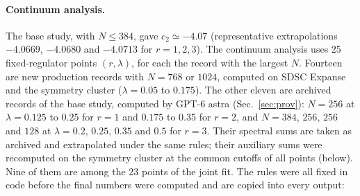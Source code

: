 \documentclass[11pt,a4paper]{article}
\numberwithin{equation}{section}
\begin{document}
\paragraph{Continuum analysis.} The base study, with $N\le384$, gave $c_2\simeq-4.07$ (representative extrapolations
$-4.0669$, $-4.0680$ and $-4.0713$ for $r=1,2,3$). The continuum analysis uses 25 fixed-regulator points $(r,\lambda)$,
for each the record with the largest $N$. Fourteen are new production records with $N=768$ or $1024$, computed on SDSC
Expanse and the symmetry cluster ($\lambda=0.05$ to $0.175$). The other eleven are archived records of the base study,
computed by GPT-6 astra (Sec.~\ref{sec:prov}): $N=256$ at $\lambda=0.125$ to $0.25$ for $r=1$ and $0.175$ to $0.35$ for
$r=2$, and $N=384$, $256$, $256$ and $128$ at $\lambda=0.2$, $0.25$, $0.35$ and $0.5$ for $r=3$. Their spectral sums are
taken as archived and extrapolated under the same rules; their auxiliary sums were recomputed on the symmetry cluster at the common cutoffs of all points
(below). Nine of them are among the 23 points of the joint fit. The rules were all fixed in code before the final
numbers were computed and are copied into every output:
\end{document}

